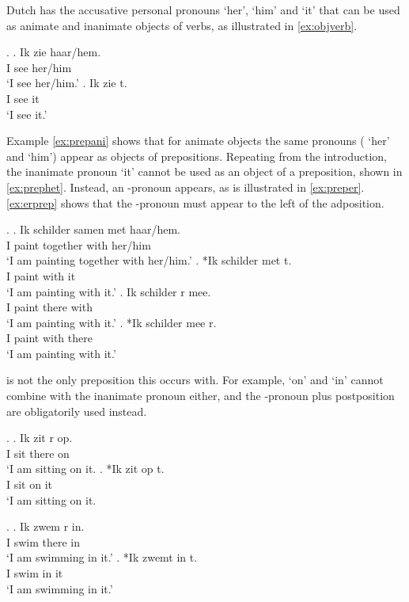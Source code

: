 \documentclass[11pt,a4paper]{article}
\begin{document}
Dutch has the accusative personal pronouns  `her',  `him' and  `it' that can be used as animate and inanimate objects of verbs, as illustrated in \ref{ex:objverb}.

 \ex. \label{ex:objverb}
 \ag. Ik zie haar/hem.\\
  I see her/him\\
  `I see her/him.'\label{ex:aniobj}
 \bg. Ik zie t.\\
  I see it\\
  `I see it.'\label{ex:inaniobj}

Example \ref{ex:prepani} shows that for animate objects the same pronouns ( `her' and  `him') appear as objects of prepositions. Repeating from the introduction, the inanimate pronoun  `it' cannot be used as an object of a preposition, shown in \ref{ex:prephet}. Instead, an -pronoun appears, as is illustrated in \ref{ex:preper}. \ref{ex:erprep} shows that the -pronoun must appear to the left of the adposition.

\ex. \label{ex:objprep}
\ag. Ik schilder samen met haar/hem.\\
 I paint together with her/him\\
 `I am painting together with her/him.'\label{ex:prepani}
\bg. *Ik schilder met t.\\
 I paint with it\\
 `I am painting with it.'\label{ex:prephet}
\bg. Ik schilder r mee.\\
 I paint there with\\
 `I am painting with it.'\label{ex:preper}
\bg. *Ik schilder mee r.\\
 I paint with there\\
 `I am painting with it.'\label{ex:erprep}

 is not the only preposition this occurs with. For example,  `on' and  `in' cannot combine with the inanimate pronoun  either, and the -pronoun plus postposition are obligatorily used instead.

\ex.
\ag. Ik zit r op.\\
 I sit there on\\
 `I am sitting on it.
\bg. *Ik zit op t.\\
 I sit on it\\
 `I am sitting on it.

\ex.
 \ag. Ik zwem r in.\\
  I swim there in\\
  `I am swimming in it.'
 \bg. *Ik zwemt in t.\\
  I swim in it\\
  `I am swimming in it.'
\end{document}
